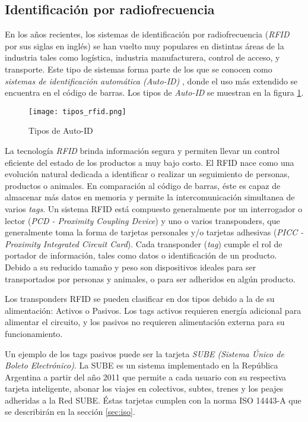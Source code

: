 \subsection{Identificación por radiofrecuencia}
En los años recientes, los sistemas de identificación por radiofrecuencia (\textit{RFID} por sus siglas en inglés) se han vuelto muy populares en distintas áreas de la industria tales como logística, industria manufacturera, control de acceso, y transporte. Este tipo de sistemas forma parte de los que se conocen como \textit{sistemas de identificación automática (Auto-ID)} \cite{rfid_handbook}, donde el uso más extendido se encuentra en el código de barras. Los tipos de \textit{Auto-ID} se muestran en la figura \ref{fig:tipos_rfid}.

\begin{figure}[H]
\texttt{[image: tipos\_rfid.png]}
\centering
\caption{Tipos de Auto-ID}
\label{fig:tipos_rfid}
\end{figure}

La tecnología \textit{RFID} brinda información segura y permiten llevar un control eficiente del estado de los productos a muy bajo costo. El RFID nace como una evolución natural dedicada a identificar o realizar un seguimiento de personas, productos o animales. En comparación al código de barras, éste es capaz de almacenar más datos en memoria y permite la intercomunicación simultanea de varios \textit{tags}. Un sistema RFID está compuesto generalmente por un interrogador o lector (\textit{PCD - Proximity Coupling Device}) y uno o varios transponders, que generalmente toma la forma de tarjetas personales y/o tarjetas adhesivas (\textit{PICC - Proximity Integrated Circuit Card}). Cada transponder (\textit{tag}) cumple el rol de portador de información, tales como datos o identificación de un producto. Debido a su reducido tamaño y peso son dispositivos ideales para ser transportados por personas y animales, o para ser adheridos en algún producto.

Los transponders RFID se pueden clasificar en dos tipos debido a la de su alimentación: Activos o Pasivos. Los tags activos requieren energía adicional para alimentar el circuito, y los pasivos no requieren alimentación externa para su funcionamiento. 

Un ejemplo de los tags pasivos puede ser la tarjeta \textit{SUBE (Sistema Único de Boleto Electrónico)}. La SUBE es un sistema implementado en la República Argentina a partir del año 2011 que permite a cada usuario con su respectiva tarjeta inteligente, abonar los viajes en colectivos, subtes, trenes y los peajes adheridas a la Red SUBE. Éstas tarjetas cumplen con la norma ISO 14443-A que se describirán en la sección \ref{sec:iso}.



